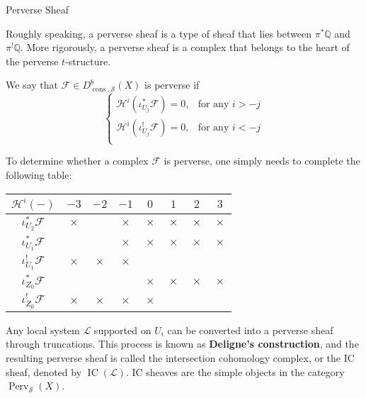\documentclass[final]{beamer}
\newlength{\colwidth}
\DeclareMathOperator{\constructable}{\operatorname{cons}}
\DeclareMathOperator{\IC}{\operatorname{IC}}
\DeclareMathOperator{\Perv}{\operatorname{Perv}}
\begin{document}
\begin{frame}[t]
\begin{columns}[t]
\begin{column}{\colwidth}
\begin{block}{Perverse Sheaf}

Roughly speaking, a perverse sheaf is a type of sheaf that lies between $\pi^* \mathbb{Q}$ and $\pi^! \mathbb{Q}$. More rigorously, a perverse sheaf is a complex that belongs to the heart of the perverse $t$-structure. 

We say that $\mathcal{F} \in D_{\constructable,\mathcal{S}}^{b}(X)$ is perverse if 
$$
\begin{cases}
\mathcal{H}^i\left(\iota_{U_j}^* \mathcal{F}\right) = 0, & \text{for any } i > -j\\
\mathcal{H}^i\left(\iota_{U_j}^! \mathcal{F}\right) = 0, & \text{for any } i < -j\\
\end{cases}
$$


To determine whether a complex $\mathcal{F}$ is perverse, one simply needs to complete the following table:
{
  \renewcommand{\arraystretch}{1.2}
  \renewcommand{\tabcolsep}{5mm}
  \newcommand{\pervcross}{\textcolor{BrickRed}{$\boldsymbol{\times}$}  }
  \newcommand{\ICcross}{\textcolor{BrickBlue}{$\boldsymbol{\times}$}  }
\begin{table}[]
\centering
\begin{tabular}{|c|c|c|c|c|c|c|c|}
\hline
           $\mathcal{H}^i(-)$                  & $-3$ & $-2$ & $-1$ & $\;0\;$ & $\;1\;$ & $\;2\;$ & $\;3\;$ \\ \hline
$\iota_{U_2}^*\mathcal{F}$ & \pervcross   &      & \pervcross     &  \pervcross   &  \pervcross   & \pervcross    &  \pervcross   \\ \hline
$\iota_{U_1}^*\mathcal{F}$ &      &      &  \ICcross    &  \pervcross   &  \pervcross   &  \pervcross   &  \pervcross   \\ \hline
$\iota_{U_1}^!\mathcal{F}$ &  \pervcross    &  \pervcross    &  \ICcross    &     &     &     &     \\ \hline
$\iota_{Z_0}^*\mathcal{F}$ &      &      &      &  \ICcross   &   \pervcross  &   \pervcross  &  \pervcross   \\ \hline
$\iota_{Z_0}^!\mathcal{F}$ &   \pervcross   &  \pervcross    &  \pervcross    &  \ICcross   &     &     &     \\ \hline
\end{tabular}
\end{table}
}
Any local system $\mathcal{L}$ supported on $U_i$ can be converted into a perverse sheaf through truncations. This process is known as \textbf{Deligne's construction}, and the resulting perverse sheaf is called the intersection cohomology complex, or the IC sheaf, denoted by $\IC(\mathcal{L})$. IC sheaves are the simple objects in the category $\Perv_{\mathcal{S}}(X)$.


\end{block}
\end{column}
\end{columns}
\end{frame}
\end{document}
